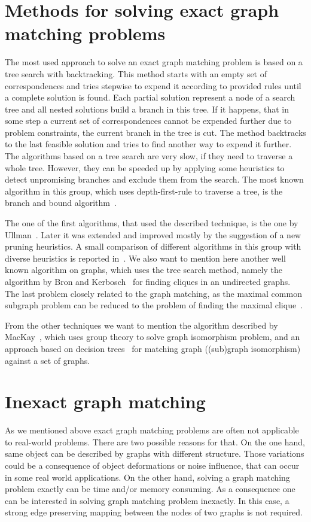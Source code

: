 \section{Methods for solving exact graph matching problems}
The most used approach to solve an exact graph matching problem is based on a tree search with backtracking. This method starts with an empty set of correspondences and tries stepwise to expend it according to provided rules until a complete solution is found. Each partial solution represent a node of a search tree and all nested solutions build a branch in this tree. If it happens, that in some step a current set of correspondences cannot be expended further due to problem constraints, the current branch in the tree is cut. The method backtracks to the last feasible solution and tries to find another way to expend it further. The algorithms based on a tree search are very slow, if they need to traverse a whole tree. However, they can be speeded up by applying some heuristics to detect unpromising branches and exclude them from the search. The most known algorithm in this group, which uses depth-first-rule to traverse a tree, is the branch and bound algorithm~\cite{Reingold}.

The one of the first algorithms, that used the described technique, is the one by Ullman~\cite{Ullmann}. Later it was extended and improved mostly by the suggestion of a new pruning heuristics. A small comparison of different algorithms in this group with diverse heuristics is reported in~\cite{Lee2013}. We also want to mention here another well known algorithm on graphs, which uses the tree search method, namely the algorithm by Bron and Kerbosch~\cite{BronKerbosch} for finding cliques in an undirected graphs. The last problem closely related to the graph matching, as the maximal common subgraph problem can be reduced to the problem of finding the maximal clique~.

From the other techniques we want to mention the algorithm described by MacKay~\cite{McKay}, which uses group theory to solve graph isomorphism problem, and an approach based on decision trees~\cite{Messmer1999,Shearer2001,Shearer1998} for matching graph ((sub)graph isomorphism) against a set of graphs.
\section{Inexact graph matching}
As we mentioned above exact graph matching problems are often not applicable to real-world problems. There are two possible reasons for that. On the one hand, same object can be described by graphs with different structure. Those variations could be a consequence of object deformations or noise influence, that can occur in some real world applications. On the other hand, solving a graph matching problem exactly can be time and/or memory consuming. As a consequence one can be interested in solving graph matching problem inexactly. In this case, a strong edge preserving mapping between the nodes of two graphs is not required.

